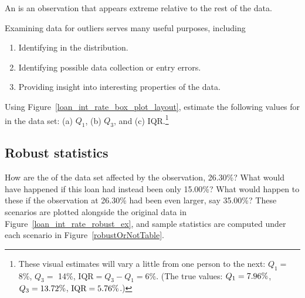 \begin{termBox}{
  An  is an observation that appears
  extreme relative to the rest of the data. \vspace{3mm}
  
  Examining data for outliers serves
  many useful purposes, including\vspace{-1mm}
  \begin{enumerate}
  \setlength{\itemsep}{0mm}
  \item Identifying
      in the distribution.
  \item Identifying possible data collection or entry
      errors.
  \item Providing insight into interesting properties
      of the data.\vspace{-1mm}
  \end{enumerate}}
\end{termBox}


\begin{exercise}
Using Figure~\ref{loan_int_rate_box_plot_layout},
estimate the following values for
 in the
 data set:
(a) $Q_1$,
(b) $Q_3$, and
(c) IQR.\footnote{These
  visual estimates will vary a little from one person
  to the next:
  $Q_1=$ 8\%,
  $Q_3=$ 14\%,
  $\text{IQR} = Q_3 - Q_1 = 6\%$.
  (The true values: $Q_1= 7.96{}\%$, $Q_3 = 13.72{}\%$,
  $\text{IQR} = 5.76{}\%$.)}
\end{exercise}



\subsection{Robust statistics}

How are the 
of the  data set affected
by the observation, 26.30\%?
What would have happened if this loan had instead
been only 15.00\%?
What would happen to these
if the observation at 26.30\% had been even larger,
say 35.00\%? These scenarios are plotted alongside the
original data in Figure~\ref{loan_int_rate_robust_ex},
and sample statistics are computed under each scenario in
Figure~\ref{robustOrNotTable}.

